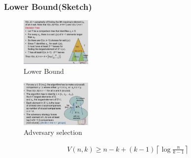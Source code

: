 \subsubsection{Lower Bound(Sketch)}

\begin{figure}[H]
    \centering
    \includegraphics[width=0.309\textwidth]{pic/DAA3/Lower Bound}
    \caption{Lower Bound}
\end{figure}
 
\begin{figure}[H]
    \centering
    \includegraphics[width=0.309\textwidth]{pic/DAA3/Adversary selection}
    \caption{Adversary selection}
\end{figure}

\begin{theorem}
    \begin{align*}
        V(n,k)\ge n-k +(k-1)\left\lceil \log\frac{n}{k-1} \right\rceil
    \end{align*}
\end{theorem}

